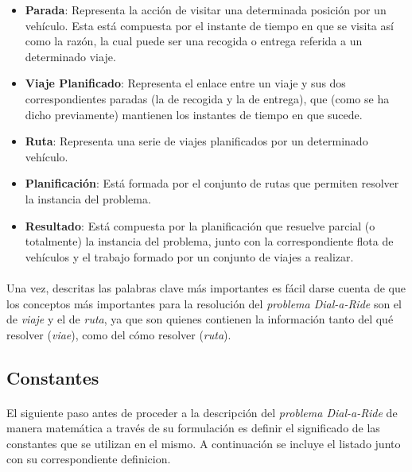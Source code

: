 \documentclass{subfiles}
\begin{document}
\begin{itemize}
          \item \textbf{Parada}: Representa la acción de visitar una determinada posición por un vehículo. Esta está compuesta por el instante de tiempo en que se visita así como la razón, la cual puede ser una recogida o entrega referida a un determinado viaje.

          \item \textbf{Viaje Planificado}: Representa el enlace entre un viaje y sus dos correspondientes paradas (la de recogida y la de entrega), que (como se ha dicho previamente) mantienen los instantes de tiempo en que sucede.

          \item \textbf{Ruta}: Representa una serie de viajes planificados por un determinado vehículo.

          \item \textbf{Planificación}: Está formada por el conjunto de rutas que permiten resolver la instancia del problema.

          \item \textbf{Resultado}: Está compuesta por la planificación que resuelve parcial (o totalmente) la instancia del problema, junto con la correspondiente flota de vehículos y el trabajo formado por un conjunto de viajes a realizar.

        \end{itemize}

        \paragraph{}
        Una vez, descritas las palabras clave más importantes es fácil darse cuenta de que los conceptos más importantes para la resolución del \emph{problema Dial-a-Ride} son el de \emph{viaje} y el de \emph{ruta}, ya que son quienes contienen la información tanto del qué resolver (\emph{viae}), como del cómo resolver (\emph{ruta}).

      \subsection{Constantes}
      \label{sec:formulation_constants}

        \paragraph{}
        El siguiente paso antes de proceder a la descripción del \emph{problema Dial-a-Ride} de manera matemática a través de su formulación es definir el significado de las constantes que se utilizan en el mismo. A continuación se incluye el listado junto con su correspondiente definicion.
\end{document}

